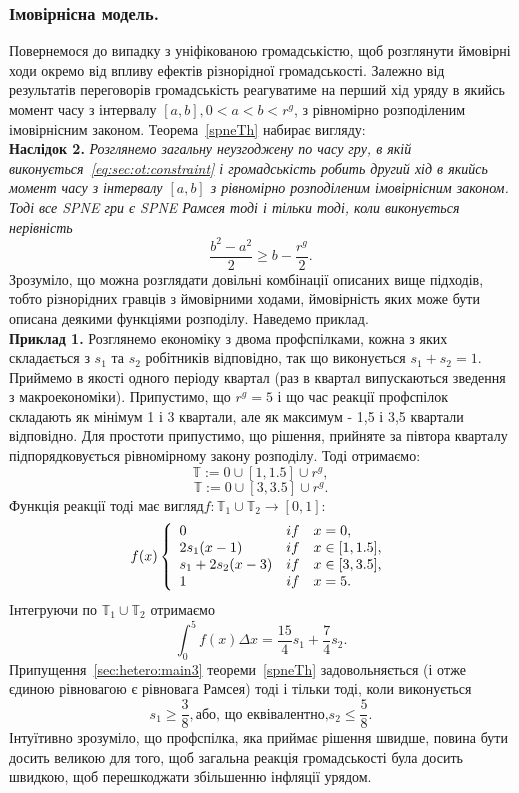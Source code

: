 \subsubsection{Імовірнісна модель.}
Повернемося до випадку з уніфікованою громадськістю, щоб розглянути ймовірні ходи окремо від впливу ефектів різнорідної громадськості. Залежно від результатів переговорів громадськість реагуватиме на перший хід уряду в якийсь момент часу з інтервалу  $[a,b], 0< a < b < r^g$, з рівномірно розподіленим імовірнісним законом. Теорема~\ref{spneTh} набирає вигляду:\\
\textbf{Наслідок 2.} \textit{Розглянемо загальну неузгоджену по часу гру, в якій виконується~\eqref{eq:sec:ot:constraint} і громадськість робить другий хід в якийсь момент часу з інтервалу $[a,b]$ з рівномірно розподіленим імовірнісним законом. Тоді все SPNE гри є SPNE Рамсея тоді і тільки тоді, коли виконується нерівність
	\begin{equation}
	\label{sec:hetero:main5}
	\frac{b^2 - a^2}{2} \geqslant b - \frac{r^g}{2} .
	\end{equation}
}
Зрозуміло, що можна розглядати довільні комбінації описаних вище підходів, тобто різнорідних гравців з ймовірними ходами, ймовірність яких може бути описана деякими функціями розподілу. Наведемо приклад.\\
\textbf{Приклад 1.} Розглянемо економіку з двома профспілками, кожна з яких складається з $s_1$ та $s_2$ робітників відповідно, так що виконується $s_1 + s_2 = 1$. Приймемо в якості одного періоду квартал (раз в квартал випускаються зведення з макроекономіки). Припустимо, що $r^g = 5$ і що час реакції профспілок складають як мінімум 1 і 3 квартали, але як максимум - 1,5 і 3,5 квартали відповідно. Для простоти припустимо, що рішення, прийняте за півтора кварталу підпорядковується рівномірному закону розподілу. Тоді отримаємо:
$$ \mathbb{T} :={0} \cup [1, 1.5] \cup {r^g} ,$$
$$ \mathbb{T} :={0} \cup [3, 3.5] \cup {r^g} .$$
Функція реакції тоді має вигляд$f : \mathbb{T}_1\cup\mathbb{T}_2\to[0,1]$:
$$ f(x)\left\{  
\begin{array}{l c l}
0 & if & x = 0,\\
2s_1(x - 1) & if & x \in [1,1.5],\\
s_1 + 2s_2(x - 3) & if & x \in [3,3.5],\\
1 & if & x = 5.
\end{array} 
\right.$$
Iнтегруючи по $\mathbb{T}_1\cup\mathbb{T}_2$ отримаємо
$$ \int_0^5 f(x) \Delta x = \frac{15}{4}s_1 + \frac{7}{4}s_2. $$
Припущення~\eqref{sec:hetero:main3} теореми~\ref{spneTh} задовольняється (і отже єдиною рівновагою є рівновага Рамсея) тоді і тільки тоді, коли виконується
$$ s_1 \geqslant \frac{3}{8}, \text{або, що еквівалентно,} s_2 \leqslant \frac{5}{8}. $$
Інтуїтивно зрозуміло, що профспілка, яка приймає рішення швидше, повина бути досить великою для того, щоб загальна реакція громадськості була досить швидкою, щоб перешкоджати збільшенню інфляції урядом.

